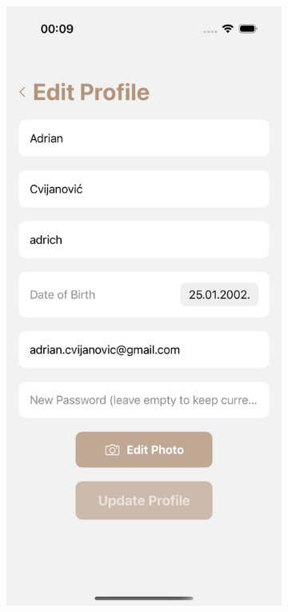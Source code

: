 \begin{figure}[H]
    \centering
    \begin{subfigure}[b]{0.35\textwidth}
        \centering
        \includegraphics[width=\textwidth]{images/implementacija/editing-options/edit_profile.png}

\end{subfigure}
\end{figure}
